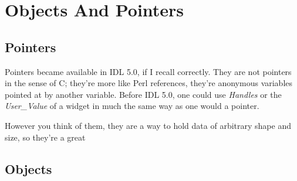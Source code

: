 \section{Objects And Pointers}\label{sec:Objects And Pointers}

\subsection{Pointers}

  Pointers became available in IDL 5.0, if I recall correctly. They
  are not pointers in the sense of C; they're more like Perl
  references, they're anonymous variables pointed at by another
  variable.  Before IDL 5.0, one could use \textit{Handles} or the
  \textit{User\_Value} of a widget in much the same way as one would a
  pointer.

  However you think of them, they are a way to hold data of arbitrary shape and size, so they're a great 
 
\subsection{Objects}